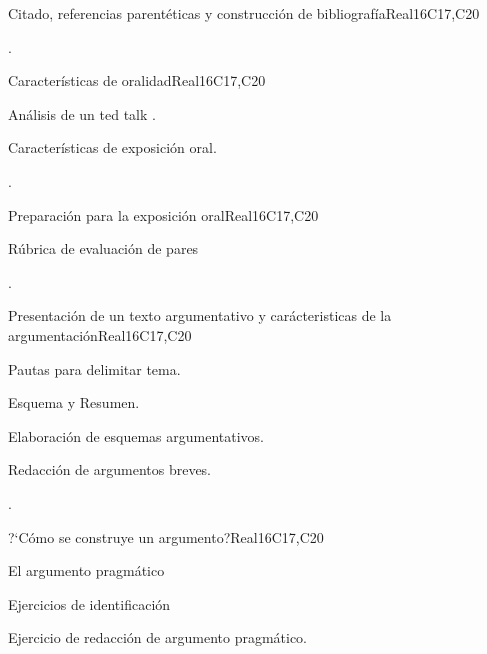 \begin{syllabus}
\begin{unit}{Citado, referencias parentéticas y construcción de bibliografía}{}{Real}{16}{C17,C20}
  \begin{learningoutcomes}
   \item .%
  \end{learningoutcomes}
\end{unit}

\begin{unit}{Características de oralidad}{}{Real}{16}{C17,C20}
  \begin{topics}
      \item Análisis de un ted talk .
      \item Características de exposición oral.
  \end{topics}

  \begin{learningoutcomes}
   \item .%
  \end{learningoutcomes}
\end{unit}

\begin{unit}{Preparación para la exposición oral}{}{Real}{16}{C17,C20}
  \begin{topics}
      \item Rúbrica de evaluación de pares
  \end{topics}

  \begin{learningoutcomes}
   \item .%
  \end{learningoutcomes}
\end{unit}

\begin{unit}{Presentación de un texto argumentativo y carácteristicas de la argumentación}{}{Real}{16}{C17,C20}
  \begin{topics}
      \item Pautas para delimitar tema.
      \item Esquema y Resumen.
      \item Elaboración de esquemas argumentativos.
      \item Redacción de argumentos breves.
  \end{topics}

  \begin{learningoutcomes}
   \item .%
  \end{learningoutcomes}
\end{unit}

\begin{unit}{?`Cómo se construye un argumento?}{}{Real}{16}{C17,C20}
  \begin{topics}
      \item El argumento pragmático
      \item Ejercicios de identificación 
      \item Ejercicio de redacción de argumento pragmático.
  \end{topics}


\end{unit}
\end{syllabus}
